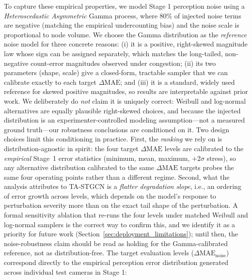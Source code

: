 \documentclass[a4paper,fleqn]{cas-sc}
\begin{document}
To capture these empirical properties, we model Stage 1 perception noise using a \emph{Heteroscedastic Asymmetric} Gamma process, where 80\% of injected noise terms are negative (matching the empirical undercounting bias) and the noise scale is proportional to node volume. We choose the Gamma distribution as the \emph{reference} noise model for three concrete reasons: (i) it is a positive, right-skewed magnitude law whose sign can be assigned separately, which matches the long-tailed, non-negative count-error magnitudes observed under congestion; (ii) its two parameters (shape, scale) give a closed-form, tractable sampler that we can calibrate exactly to each target $\Delta\text{MAE}$; and (iii) it is a standard, widely used reference for skewed positive magnitudes, so results are interpretable against prior work. We deliberately do \emph{not} claim it is uniquely correct: Weibull and log-normal alternatives are equally plausible right-skewed choices, and because the injected distribution is an experimenter-controlled modeling assumption---not a measured ground truth---our robustness conclusions are conditioned on it. Two design choices limit this conditioning in practice. First, the \emph{ranking} we rely on is distribution-agnostic in spirit: the four target $\Delta\text{MAE}$ levels are calibrated to the \emph{empirical} Stage~1 error statistics (minimum, mean, maximum, $+2\sigma$ stress), so any alternative distribution calibrated to the same $\Delta\text{MAE}$ targets probes the same four operating points rather than a different regime. Second, what the analysis attributes to TA-STGCN is a \emph{flatter degradation slope}, i.e., an ordering of error growth across levels, which depends on the model's response to perturbation severity more than on the exact tail shape of the perturbation. A formal sensitivity ablation that re-runs the four levels under matched Weibull and log-normal samplers is the correct way to confirm this, and we identify it as a priority for future work (Section~\ref{sec:deployment_limitations}); until then, the noise-robustness claim should be read as holding for the Gamma-calibrated reference, not as distribution-free. The target evaluation levels ($\Delta \text{MAE}_{\text{noise}}$) correspond directly to the empirical perception error distribution generated across individual test cameras in Stage 1:
\end{document}
